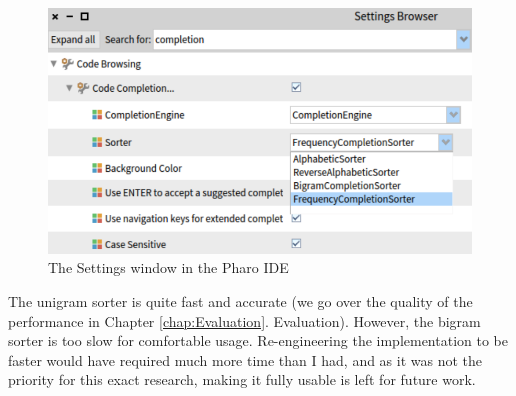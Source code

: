 \begin{figure}[H]
    \centering
    \includegraphics[width=0.9\linewidth]{images/settings.png}
    \caption{The Settings window in the Pharo IDE}
    \label{fig:settings}
\end{figure}

The unigram sorter is quite fast and accurate (we go over the quality of the performance in Chapter \ref{chap:Evaluation}. Evaluation). However, the bigram sorter is too slow for comfortable usage. Re-engineering the implementation to be faster would have required much more time than I had, and as it was not the priority for this exact research, making it fully usable is left for future work.

